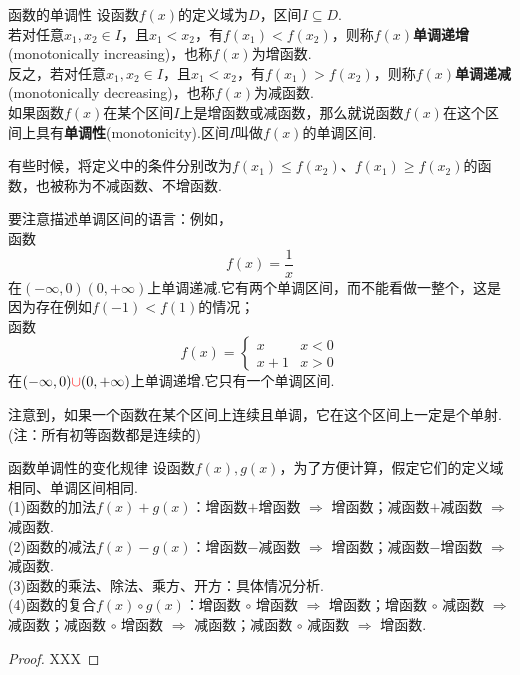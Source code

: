 \documentclass[lang=cn, zihao=5]{elegantbook}
\begin{document}
\begin{definition}{函数的单调性} %
    设函数$f(x)$的定义域为$D$，区间$I \subseteq D$.\\
    若对任意$x_1,x_2 \in I$，且$x_1 < x_2$，有$f(x_1) < f(x_2)$，则称$f(x)$\textbf{单调递增}(monotonically increasing)，也称$f(x)$为增函数.\\
    反之，若对任意$x_1,x_2 \in I$，且$x_1 < x_2$，有$f(x_1) > f(x_2)$，则称$f(x)$\textbf{单调递减}(monotonically decreasing)，也称$f(x)$为减函数.\\
    如果函数$f(x)$在某个区间$I$上是增函数或减函数，那么就说函数$f(x)$在这个区间上具有\textbf{单调性}(monotonicity).区间$I$叫做$f(x)$的单调区间.
\end{definition}
\begin{remark}
    有些时候，将定义中的条件分别改为$f(x_1) \leq f(x_2)$、$f(x_1) \geq f(x_2)$的函数，也被称为不减函数、不增函数.
\end{remark}
\begin{note}
    要注意描述单调区间的语言：例如，\\
    函数$$f(x)=\frac{1}{x}$$
    在$(- \infty , 0)$\color{red}{和}\color{black}$(0 , + \infty)$上单调递减.它有两个单调区间，而不能看做一整个，这是因为存在例如$f(-1) < f(1)$的情况；\\
    函数$$ f(x)=\begin{cases}
    	x &x<0 \\
    	x+1 &x>0
    \end{cases}$$
    在$(- \infty , 0) \color{red}{\cup}\color{black} (0 , + \infty)$上单调递增.它只有一个单调区间.
\end{note}

注意到，如果一个函数在某个区间上连续且单调，它在这个区间上一定是个单射.(注：所有初等函数都是连续的)

\begin{proposition}{函数单调性的变化规律}
    设函数$f(x),g(x)$，为了方便计算，假定它们的定义域相同、单调区间相同.\\
    (1)函数的加法$f(x)+g(x)$：增函数$+$增函数 $\Rightarrow$ 增函数；减函数$+$减函数 $\Rightarrow$ 减函数.\\
    (2)函数的减法$f(x)-g(x)$：增函数$-$减函数 $\Rightarrow$ 增函数；减函数$-$增函数 $\Rightarrow$ 减函数.\\
    (3)函数的乘法、除法、乘方、开方：具体情况分析.\\
    (4)函数的复合$f(x) \circ g(x)$：增函数 $\circ$ 增函数 $\Rightarrow$ 增函数；增函数 $\circ$ 减函数 $\Rightarrow$ 减函数；减函数 $\circ$ 增函数 $\Rightarrow$ 减函数；减函数 $\circ$ 减函数 $\Rightarrow$ 增函数.
\end{proposition}
\begin{proof}
    XXX
\end{proof}
\end{document}
